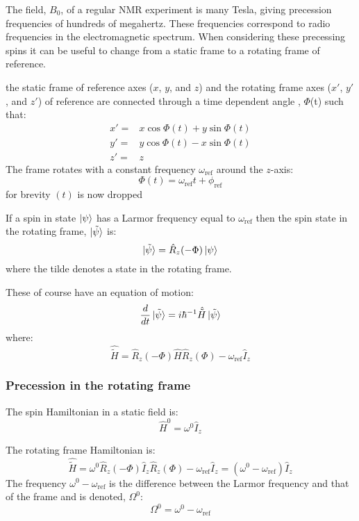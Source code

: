 The field, $B_0$, of a regular NMR experiment is many Tesla, giving precession
frequencies of hundreds of megahertz. These frequencies correspond to radio frequencies
in the electromagnetic spectrum. When considering these precessing spins
it can be useful to change from a static frame to a rotating frame of reference.

the static frame of reference axes ($x$, $y$, and $z$) and the rotating frame axes ($x'$, $y'$, and $z'$) of reference are connected through
a time dependent angle , $\Phi$(t) such that:
\begin{align}
  x' =& x\cos\Phi(t) + y\sin\Phi(t)\\
  y' =& y\cos\Phi(t) - x\sin\Phi(t)\\
  z' =& z
\end{align}
The frame rotates with a constant frequency $\omega_\text{ref}$ around the $z$-axis:
\begin{equation}
  \Phi(t) = \omega_{\text{ref}}t + \phi_{\text{ref}}
\end{equation}
for brevity $(t)$ is now dropped

If a spin in state $\ket{\psi}$ has a Larmor frequency equal to $\omega_\text{ref}$
then the spin state in the rotating frame, $\ket{\tilde{\psi}}$ is:
\begin{equation}
  \ket{\tilde{\psi}} = \hat{R}_z(-\Phi)\ket{\psi}
\end{equation}
where the tilde denotes a state in the rotating frame.

These of course have an equation of motion:
\begin{equation}
  \frac{d}{dt}\ket{\tilde{\psi}} = i\hbar^{-1}\hat{\tilde{H}}\ket{\tilde{\psi}}
\end{equation}
where:
\begin{equation}\label{eqn:RotFrame}
  \hat{\tilde{H}} = \hat{R}_z(-\Phi)\hat{H}\hat{R}_z(\Phi) - \omega_\text{ref}\hat{I}_z
\end{equation}

\subsubsection{Precession in the rotating frame}
The spin Hamiltonian in a static field is:
\begin{equation}
  \hat{H}^0 = \omega^0\hat{I}_z
\end{equation}

The rotating frame Hamiltonian is:
\begin{equation}
  \hat{\tilde{H}} = \omega^0\hat{R}_z(-\Phi)\hat{I}_z\hat{R}_z(\Phi) - \omega_\text{ref}\hat{I}_z =
  (\omega^0 - \omega_\text{ref})\hat{I}_z
\end{equation}
The frequency $\omega^0 - \omega_\text{ref}$ is the difference between the Larmor frequency
and that of the frame and is denoted, $\Omega^0$:
\begin{equation}
  \Omega^0 = \omega^0 - \omega_\text{ref}
\end{equation}

